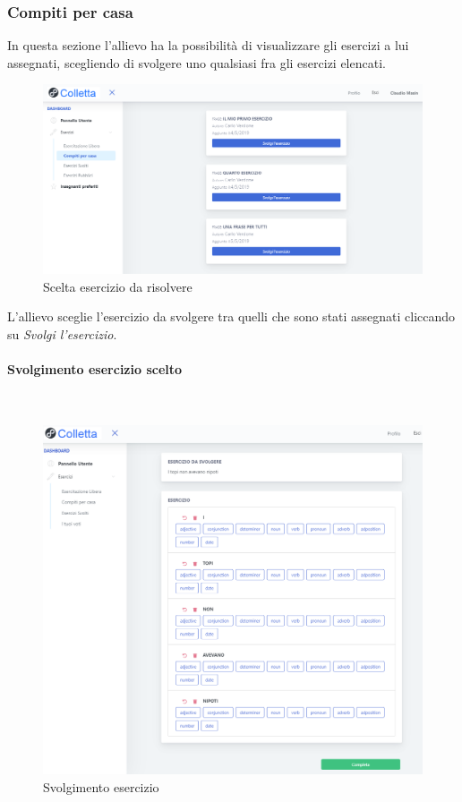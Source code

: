       
        \newpage
  		\subsubsection{Compiti per casa}
 		  In questa sezione l'allievo ha la possibilità di visualizzare gli esercizi a lui assegnati, scegliendo di svolgere uno qualsiasi fra gli esercizi elencati.
        	\begin{figure}[H]
            	\centering
            	\includegraphics[width=17cm]{sez/img/studente/compitopercasa.PNG} 
            	\caption{Scelta esercizio da risolvere}\label{fig:1}
        	\end{figure}

		  L'allievo sceglie l'esercizio da svolgere tra quelli che sono stati assegnati cliccando su \textit{Svolgi l'esercizio}.  
		  
		  
\newpage		   
       \paragraph{Svolgimento esercizio scelto}\mbox{}\\
        	
        	\begin{figure}[H]
            	\centering
            	\includegraphics[width=17cm]{sez/img/studente/svolgimentoesercizio.PNG} 
            	\caption{Svolgimento esercizio}\label{fig:1}
        	\end{figure} 
        	     
